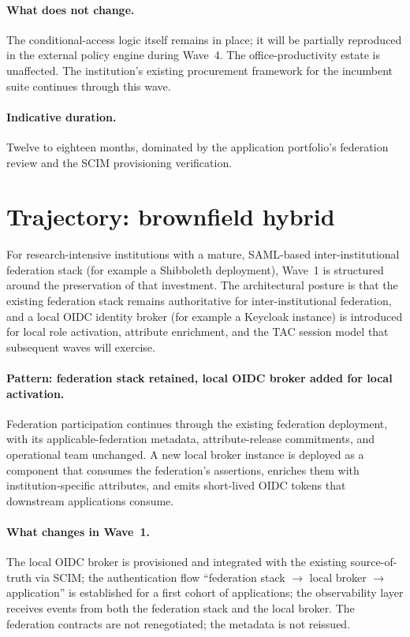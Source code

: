 \paragraph{What does not change.} The conditional-access logic
itself remains in place; it will be partially reproduced in the
external policy engine
during Wave~4. The office-productivity estate is unaffected. The
institution's existing procurement framework for the incumbent
suite continues
through this wave.

\paragraph{Indicative duration.} Twelve to eighteen months,
dominated by the application portfolio's federation review and the
SCIM provisioning verification.

\section{Trajectory: brownfield hybrid}
\label{sec:w1-brownfield-hybrid}

For research-intensive institutions with a mature, SAML-based
inter-institutional federation stack (for example a Shibboleth
deployment), Wave~1 is structured around the preservation of
that investment. The architectural posture is that the existing
federation stack
remains authoritative for inter-institutional federation, and a
local OIDC identity broker (for example a Keycloak instance) is
introduced for local role activation, attribute
enrichment, and the TAC session model that subsequent waves will
exercise.

\paragraph{Pattern: federation stack retained, local OIDC broker
added for local
activation.} Federation participation continues through the
existing federation deployment, with its
applicable-federation metadata,
attribute-release commitments, and operational team unchanged. A
new local broker instance is deployed as a component that
consumes the federation's assertions, enriches them with
institution-specific attributes, and emits short-lived OIDC tokens
that downstream applications consume.

\paragraph{What changes in Wave~1.} The local OIDC broker is
provisioned and
integrated with the existing source-of-truth via SCIM; the
authentication flow ``federation stack $\rightarrow$ local broker
$\rightarrow$
application'' is established for a first cohort of applications;
the observability layer receives events from both the federation
stack and the local broker. The federation contracts are not
renegotiated; the
metadata is not reissued.

